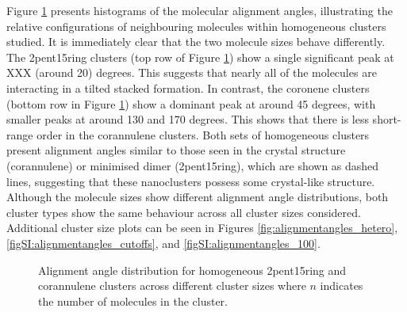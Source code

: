 Figure \ref{fig:alignmentangles_homo} presents histograms of the molecular alignment angles, illustrating the relative configurations of neighbouring molecules within homogeneous clusters studied.
It is immediately clear that the two molecule sizes behave differently. The 2pent15ring clusters (top row of Figure \ref{fig:alignmentangles_homo}) show a single significant peak at XXX (around 20) degrees.  This suggests that nearly all of the molecules are interacting in a tilted stacked formation. In contrast, the coronene clusters (bottom row in Figure \ref{fig:alignmentangles_homo}) show a dominant peak at around 45 degrees, with smaller peaks at around 130 and 170 degrees. This shows that there is less short-range order in the corannulene clusters. Both sets of homogeneous clusters present alignment angles similar to those seen in the crystal structure (corannulene) or minimised dimer (2pent15ring), which are shown as dashed lines, suggesting that these nanoclusters possess some crystal-like structure.  Although the molecule sizes show different alignment angle distributions, both cluster types show the same behaviour across all cluster sizes considered. Additional cluster size plots can be seen in Figures \ref{fig:alignmentangles_hetero}, \ref{figSI:alignmentangles_cutoffs}, and \ref{figSI:alignmentangles_100}.
%
\begin{figure}[!tbh]
\centering
\caption{Alignment angle distribution for homogeneous 2pent15ring and corannulene clusters across different cluster sizes where $n$ indicates the number of molecules in the cluster.}
\label{fig:alignmentangles_homo}
\end{figure}
%

